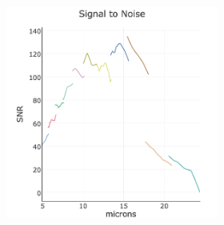 \documentclass[12pt]{article}
\begin{document}
\clearpage

%
%
\describeobservations   %


\hspace{-2.5cm}
\begin{figure}[h]
  \begin{center}
    \hspace{-0.5cm}
    \includegraphics[height=7.0cm,width=7.0cm]{../Figures/current_wavelength_vsSNR.png}
    \vspace{-10pt}
    \caption{       \footnotesize}
    \vspace{-14pt}
    \label{figtest-fig}
  \end{center}
\end{figure}




%
%
\alttargets   %


%
%
\specialreq             %
\end{document}
